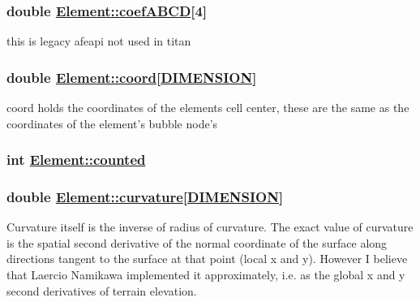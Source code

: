 \hypertarget{classElement_r35}{
\subsubsection[coefABCD]{\setlength{\rightskip}{0pt plus 5cm}double \hyperlink{classElement_r35}{Element::coef\-ABCD}\mbox{[}4\mbox{]}}}
\label{classElement_r35}


this is legacy afeapi not used in titan 

\hypertarget{classElement_r24}{
\subsubsection[coord]{\setlength{\rightskip}{0pt plus 5cm}double \hyperlink{classElement_r24}{Element::coord}\mbox{[}\hyperlink{constant_8h_a15}{DIMENSION}\mbox{]}}}
\label{classElement_r24}


coord holds the coordinates of the elements cell center, these are the same as the coordinates of the element's bubble node's 

\hypertarget{classElement_r48}{
\subsubsection[counted]{\setlength{\rightskip}{0pt plus 5cm}int \hyperlink{classElement_r48}{Element::counted}}}
\label{classElement_r48}


\hypertarget{classElement_r39}{
\subsubsection[curvature]{\setlength{\rightskip}{0pt plus 5cm}double \hyperlink{classElement_r39}{Element::curvature}\mbox{[}\hyperlink{constant_8h_a15}{DIMENSION}\mbox{]}}}
\label{classElement_r39}


Curvature itself is the inverse of radius of curvature. The exact value of curvature is the spatial second derivative of the normal coordinate of the surface along directions tangent to the surface at that point (local x and y). However I believe that Laercio Namikawa implemented it approximately, i.e. as the global x and y second derivatives of terrain elevation. 

